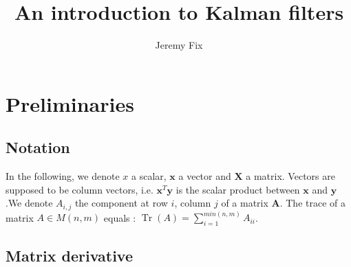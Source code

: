 \documentclass[10pt,oneside]{scrartcl}
\title{An introduction to Kalman filters}
\author{Jeremy Fix}
\newcommand\vecteur[1]{\boldsymbol#1}
\newcommand\matrice[1]{\mathbf#1}
\newcommand\trace{\operatorname*{Tr}}
\begin{document}
\maketitle

\tableofcontents

\pagebreak

\section{Preliminaries}
\label{sec_kalman_math}
\subsection{Notation}

In the following, we denote $x$ a scalar, $\vecteur{x}$ a vector and $\matrice{X}$ a matrix. Vectors are supposed to be column vectors, i.e. $\vecteur{x}^T\vecteur{y}$ is the scalar product between $\vecteur{x}$ and $\vecteur{y}$.We denote $A_{i,j}$ the component at row $i$, column $j$ of a matrix $\matrice{A}$. The trace of a matrix $A \in M(n,m)$ equals : $\trace(A) = \sum_{i=1}^{min(n,m)} A_{ii}$. \\

\subsection{Matrix derivative}
\end{document}
